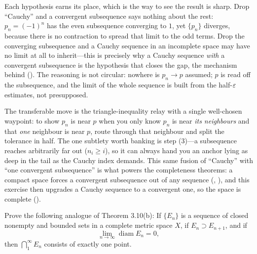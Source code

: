 \documentclass[main.tex]{subfiles}
\begin{document}
\begin{Reflection}
Each hypothesis earns its place, which is the way to see the result is sharp. Drop ``Cauchy'' and a
convergent subsequence says nothing about the rest: $p_n=(-1)^n$ has the even subsequence converging to
$1$, yet $\{p_n\}$ diverges, because there is no contraction to spread that limit to the odd terms. Drop
the converging subsequence and a Cauchy sequence in an incomplete space may have no limit at all to
inherit---this is precisely why a Cauchy sequence \emph{with} a convergent subsequence is the hypothesis
that closes the gap, the mechanism behind  (). The reasoning is not circular: nowhere is $p_n\to p$ assumed; $p$ is
read off the subsequence, and the limit of the whole sequence is built from the half-$\varepsilon$ estimates,
not presupposed.

The transferable move is the triangle-inequality relay with a single well-chosen waypoint: to show
$p_n$ is near $p$ when you only know $p_n$ is near \emph{its neighbours} and that \emph{one} neighbour
is near $p$, route through that neighbour and split the tolerance in half. The one subtlety worth
banking is step (3)---a subsequence reaches arbitrarily far out ($n_i\ge i$), so it can always hand you
an anchor lying as deep in the tail as the Cauchy index demands. This same fusion of ``Cauchy'' with
``one convergent subsequence'' is what powers the completeness theorems: a compact space forces a
convergent subsequence out of any sequence (, ), and this exercise then upgrades a Cauchy sequence to a
convergent one, so the space is complete ().
\end{Reflection}

Prove the following analogue of Theorem 3.10(b): If $\{E_{n}\}$ is a sequence of closed nonempty and
bounded sets in a complete metric space $X$, if $E_{n} \supset E_{n+1}$, and if
\[
\lim_{n\to\infty} \operatorname{diam} E_{n} = 0,
\]
then $\bigcap_{1}^{\infty} E_{n}$ consists of exactly one point.
\end{document}
